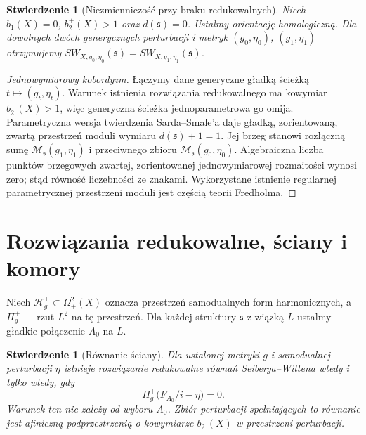 \documentclass[11pt,a4paper]{report}
\numberwithin{equation}{section}
\theoremstyle{plain}
\newtheorem{stwierdzenie}[twierdzenie]{Stwierdzenie}
\theoremstyle{definition}
\theoremstyle{remark}
\begin{document}
\begin{stwierdzenie}[Niezmienniczość przy braku redukowalnych]
\label{prop:tg-sw-cobordism}
Niech $b_1(X)=0$, $b_2^+(X)>1$ oraz
$d(\mathfrak s)=0$. Ustalmy orientację homologiczną.
Dla dowolnych dwóch generycznych perturbacji i metryk
$(g_0,\eta_0)$, $(g_1,\eta_1)$ otrzymujemy
$SW_{X,g_0,\eta_0}(\mathfrak s)
=SW_{X,g_1,\eta_1}(\mathfrak s)$.
\end{stwierdzenie}

\begin{proof}[Jednowymiarowy kobordyzm]
Łączymy dane generyczne gładką ścieżką
$t\mapsto(g_t,\eta_t)$. Warunek istnienia rozwiązania
redukowalnego ma kowymiar $b_2^+(X)>1$,
więc generyczna ścieżka jednoparametrowa go omija.
Parametryczna wersja twierdzenia Sarda--Smale'a
daje gładką, zorientowaną, zwartą przestrzeń moduli
wymiaru $d(\mathfrak s)+1=1$.
Jej brzeg stanowi rozłączną sumę
$\mathcal M_{\mathfrak s}(g_1,\eta_1)$ i przeciwnego
zbioru $\mathcal M_{\mathfrak s}(g_0,\eta_0)$.
Algebraiczna liczba punktów brzegowych zwartej,
zorientowanej jednowymiarowej rozmaitości wynosi zero;
stąd równość liczebności ze znakami.
Wykorzystane istnienie regularnej parametrycznej
przestrzeni moduli jest częścią teorii Fredholma.
\end{proof}

\section{Rozwiązania redukowalne, ściany i komory}
\label{sec:tg-sw-chambers}

Niech $\mathcal H_g^+\subset\Omega^2_+(X)$ oznacza
przestrzeń samodualnych form harmonicznych, a
$\Pi_g^+$ --- rzut $L^2$ na tę przestrzeń.
Dla każdej struktury $\mathfrak s$ z wiązką $L$
ustalmy gładkie połączenie $A_0$ na $L$.

\begin{stwierdzenie}[Równanie ściany]
\label{prop:tg-sw-wall}
Dla ustalonej metryki $g$ i samodualnej perturbacji
$\eta$ istnieje rozwiązanie redukowalne równań
Seiberga--Wittena wtedy i tylko wtedy, gdy
\[
\Pi_g^+\bigl(F_{A_0}/i-\eta\bigr)=0.
\]
Warunek ten nie zależy od wyboru $A_0$. Zbiór perturbacji
spełniających to równanie jest afiniczną podprzestrzenią
o kowymiarze $b_2^+(X)$ w przestrzeni perturbacji.
\end{stwierdzenie}
\end{document}
